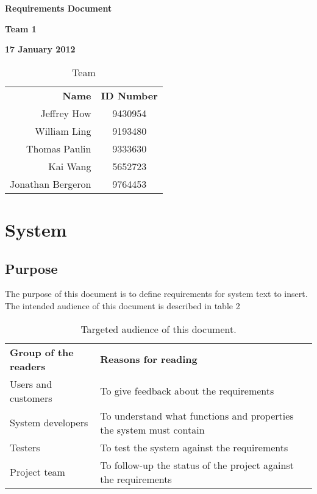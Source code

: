 \documentclass[12pt]{article}
\newcommand{\systemName}{text to insert}
\begin{document}
\vspace*{0.5in}
\centerline{\bf\Large Requirements Document}

\vspace*{0.5in}
\centerline{\bf\Large Team 1}

\vspace*{0.5in}
\centerline{\bf\Large 17 January 2012}

\vspace*{1.5in}
\begin{table}[htbp]
\caption{Team}
\begin{center}
\begin{tabular}{|r | c|}
\hline
{\bf Name} & {\bf ID Number} \\
Jeffrey How & 9430954 \\
William Ling & 9193480 \\
Thomas Paulin & 9333630 \\
Kai Wang & 5652723 \\
Jonathan Bergeron & 9764453 \\
\hline
\end{tabular}
\end{center}
\end{table}

\clearpage

\section{System}

\subsection{Purpose}
The purpose of this document is to define requirements for system \systemName.
\newline\newline
The intended audience of this document is described in table 2
\newline
\begin{table}[htbp]
\caption{Targeted audience of this document.}
\begin{center}
\begin{tabular}{|l | l|}
\hline
{\bf Group of the readers} & {\bf Reasons for reading}\\ \cline{1-2}
Users and customers & To give feedback about the requirements\\ \cline{1-2}
System developers & To understand what functions and properties the system must contain\\ \cline{1-2}
Testers & To test the system against the requirements\\ \cline{1-2}
Project team & To follow-up the status of the project against the requirements\\ \cline{1-2}
\hline
\end{tabular}
\end{center}
\end{table}
\end{document}
